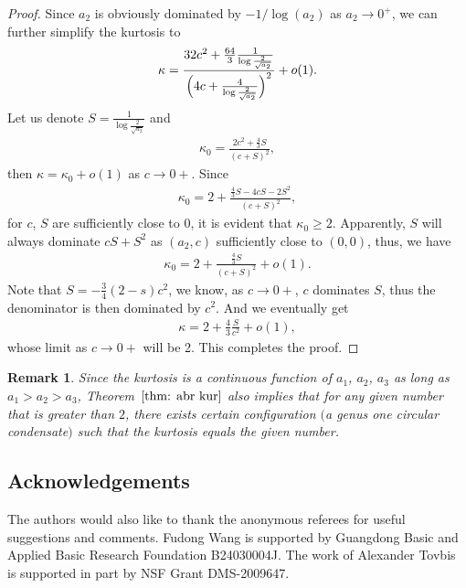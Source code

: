 \documentclass[10pt,a4paper]{amsart}
\numberwithin{equation}{section}
\newtheorem{Remark}[Theorem]{Remark}
\def\ra{\rightarrow}
\begin{document}
\begin{proof}
Since $a_2$ is obviously dominated by $-1/\log(a_2)$ as $a_2\ra 0^+$, we can further simplify the kurtosis to
\begin{align*}
\kappa = \frac{32c^2+\frac{64}{3}\frac{1}{\log\frac{2}{\sqrt{a_2}}}}{\Bigl(4c+\frac{4}{\log\frac{2}{\sqrt{a_2}}}\Bigr)^2}+o(1).
\end{align*}
Let us denote $S=\frac{1}{\log\frac{2}{\sqrt{a_2}}}$ and
\begin{align*}
\kappa_{0}=\frac{2c^2+\frac{4}{3}S}{(c+S)^2},
\end{align*}
then $\kappa=\kappa_0+o(1)$ as $c\ra 0+$.
Since
\begin{align*}
\kappa_0=2+\frac{\frac{4}{3}S-4cS-2S^2}{(c+S)^2},
\end{align*}
for $c$, $S$ are sufficiently close to $0$, it is evident that $\kappa_0\geq 2$. Apparently, $S$ will always dominate $cS+S^2$ as $(a_2,c)$ sufficiently close to $(0,0)$, thus, we have
\begin{align*}
\kappa_0=2+\frac{\frac{4}{3}S}{(c+S)^2}+o(1).
\end{align*}
Note that $S=-\frac{3}{4}(2-s)c^2$, we know, as $c\ra 0+$, $c$ dominates $S$, thus the denominator is then dominated by $c^2$. And we eventually get
\begin{align*}
\kappa=2+\frac{4}{3}\frac{S}{c^2}+o(1),
\end{align*}
whose limit as $c\ra 0+$ will be 2. This completes the proof.
\end{proof}

\begin{Remark}
Since the kurtosis is a continuous function of $a_1$, $a_2$, $a_3$ as long as $a_1>a_2>a_3$, Theorem~$\ref{thm: abr kur}$ also implies that for any given number that is greater than $2$, there exists certain configuration $($a genus one circular condensate$)$ such that the kurtosis equals the given number.
\end{Remark}


\subsection*{Acknowledgements}

The authors would also like to thank the anonymous referees for useful suggestions and comments. Fudong Wang is supported by Guangdong Basic and Applied Basic Research Foundation B24030004J. The work of Alexander Tovbis is supported in part by NSF Grant DMS-2009647.

\end{document}
